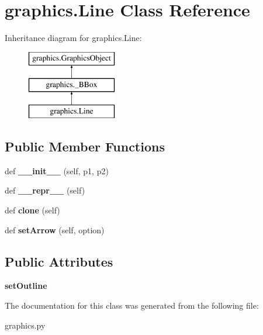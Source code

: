 \hypertarget{classgraphics_1_1_line}{}\section{graphics.\+Line Class Reference}
\label{classgraphics_1_1_line}
Inheritance diagram for graphics.\+Line\+:\begin{figure}[H]
\begin{center}
\leavevmode
\includegraphics[height=3.000000cm]{classgraphics_1_1_line}
\end{center}
\end{figure}
\subsection*{Public Member Functions}
\begin{DoxyCompactItemize}
\item 
\mbox{\label{classgraphics_1_1_line_a8aab9ed90de9a987a2ea6446caca2188}} 
def {\bfseries \+\_\+\+\_\+init\+\_\+\+\_\+} (self, p1, p2)
\item 
\mbox{\label{classgraphics_1_1_line_a9f0196b56e225e7c1688b55486848ad5}} 
def {\bfseries \+\_\+\+\_\+repr\+\_\+\+\_\+} (self)
\item 
\mbox{\label{classgraphics_1_1_line_a2691c6ba64cfb04f32a585d40f1a7e1e}} 
def {\bfseries clone} (self)
\item 
\mbox{\label{classgraphics_1_1_line_aef621dc2bfe50449ac764fda18ede3b6}} 
def {\bfseries set\+Arrow} (self, option)
\end{DoxyCompactItemize}
\subsection*{Public Attributes}
\begin{DoxyCompactItemize}
\item 
\mbox{\label{classgraphics_1_1_line_a2462ca216d643515e7956d8e3688bf44}} 
{\bfseries set\+Outline}
\end{DoxyCompactItemize}


The documentation for this class was generated from the following file\+:\begin{DoxyCompactItemize}
\item 
graphics.\+py\end{DoxyCompactItemize}
